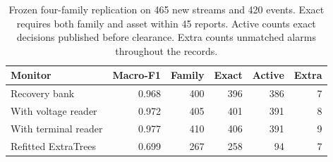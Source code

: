 \begin{table}[t]\centering\footnotesize
\caption{Frozen four-family replication on 465 new streams and 420 events. Exact requires both family and asset within 45 reports. Active counts exact decisions published before clearance. Extra counts unmatched alarms throughout the records.}
\label{tab:torque-terminal-trial}
\setlength{\tabcolsep}{2.5pt}
\begin{tabular*}{\columnwidth}{@{\extracolsep{\fill}}lrrrrr@{}}\toprule
Monitor & Macro-F1 & Family & Exact & Active & Extra\\\midrule
Recovery bank & 0.968 & 400 & 396 & 386 & 7 \\
With voltage reader & 0.972 & 405 & 401 & 391 & 8 \\
With terminal reader & 0.977 & 410 & 406 & 391 & 9 \\
Refitted ExtraTrees & 0.699 & 267 & 258 & 94 & 7 \\
\bottomrule\end{tabular*}\end{table}
